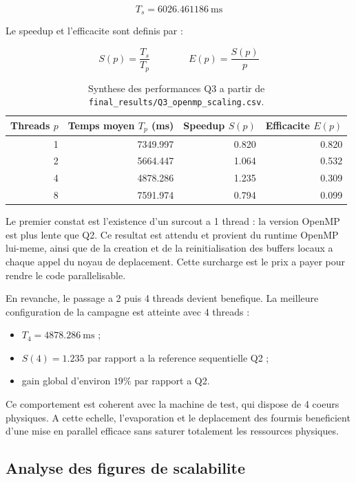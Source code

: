 \documentclass[11pt,a4paper]{article}
\begin{document}
\[
T_s = 6026.461186\ \text{ms}
\]

Le speedup et l'efficacite sont definis par :

\[
S(p) = \frac{T_s}{T_p}
\qquad\qquad
E(p) = \frac{S(p)}{p}
\]

\begin{table}[H]
  \centering
  \small
  \caption{Synthese des performances Q3 a partir de \texttt{final\_results/Q3\_openmp\_scaling.csv}.}
  \label{tab:q3-scaling}
  \begin{tabular}{@{}rrrr@{}}
    \toprule
    Threads \(p\) & Temps moyen \(T_p\) (ms) & Speedup \(S(p)\) & Efficacite \(E(p)\) \\
    \midrule
    1 & 7349.997 & 0.820 & 0.820 \\
    2 & 5664.447 & 1.064 & 0.532 \\
    4 & 4878.286 & 1.235 & 0.309 \\
    8 & 7591.974 & 0.794 & 0.099 \\
    \bottomrule
  \end{tabular}
\end{table}

Le premier constat est l'existence d'un surcout a 1 thread : la version OpenMP est plus lente que Q2. Ce resultat est attendu et provient du runtime OpenMP lui-meme, ainsi que de la creation et de la reinitialisation des buffers locaux a chaque appel du noyau de deplacement. Cette surcharge est le prix a payer pour rendre le code parallelisable.

En revanche, le passage a 2 puis 4 threads devient benefique. La meilleure configuration de la campagne est atteinte avec 4 threads :

\begin{itemize}[leftmargin=1.2em]
  \item \(T_4 = 4878.286\ \text{ms}\) ;
  \item \(S(4) = 1.235\) par rapport a la reference sequentielle Q2 ;
  \item gain global d'environ \(19\%\) par rapport a Q2.
\end{itemize}

Ce comportement est coherent avec la machine de test, qui dispose de 4 coeurs physiques. A cette echelle, l'evaporation et le deplacement des fourmis beneficient d'une mise en parallel efficace sans saturer totalement les ressources physiques.

\subsection{Analyse des figures de scalabilite}
\end{document}
